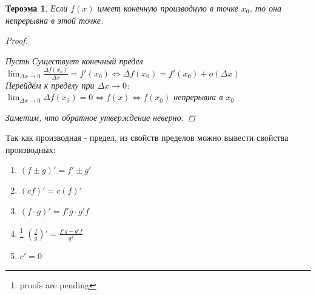 \documentclass[oneside]{book}
\newtheorem{thm}{Тероэма}[chapter] %
\begin{document}
\begin{enumerate}
\begin{thm}
	Если $f(x)$ имеет конечную производную в точке $x_0$, то она непрерывна в этой точке.
  \begin{proof}
    \begin{center}
      Пусть Существует конечный предел \\
      $\lim_{\Delta x \rightarrow 0}{\frac{\Delta f(x_0)}{\Delta x }} = f'(x_0) \Leftrightarrow \Delta f(x_0) = f'(x_0)+o(\Delta x)$ \\
      Перейдём к пределу при $\Delta x \rightarrow 0$: \\
      $\lim_{\Delta x \rightarrow 0}{\Delta f(x_0)} = 0 \Leftrightarrow f(x) \Leftrightarrow f(x_0)$ непрерывна в $x_0$ \\
    \end{center}
    Заметим, что обратное утверждение неверно.
  \end{proof}
\end {thm}
Так как производная - предел, из свойств пределов можно вывести свойства производных:
\begin{enumerate}
  \item $(f \pm g)' = f' \pm g'$
  \item $(cf)' = c(f)'$
  \item $(f \cdot g)' = f'g \cdot g'f$
  \item\footnote{proofs are pending} $(\frac{f}{g})' = \frac{f'g - g'f}{g^2}$
  \item $c' = 0$
\end{enumerate}
  \begin{center}

\end{center}
\end{enumerate}
\end{document}
